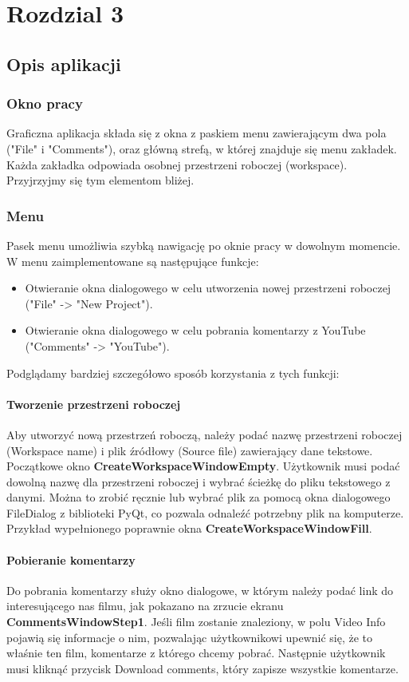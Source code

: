 \chapter{Rozdzial 3}

\section{Opis aplikacji}
	\subsection{Okno pracy}
		Graficzna aplikacja składa się z okna z paskiem menu zawierającym dwa pola ("File" i "Comments"), oraz główną strefą, w której znajduje się menu zakładek. Każda zakładka odpowiada osobnej przestrzeni roboczej (workspace). Przyjrzyjmy się tym elementom bliżej.

		
	\subsection{Menu}
		Pasek menu umożliwia szybką nawigację po oknie pracy w dowolnym momencie. W menu zaimplementowane są następujące funkcje:
		\begin{itemize}
			\item Otwieranie okna dialogowego w celu utworzenia nowej przestrzeni roboczej ("File" -> "New Project").
			\item Otwieranie okna dialogowego w celu pobrania komentarzy z YouTube ("Comments" -> "YouTube").
		\end{itemize}

		Podglądamy bardziej szczegółowo sposób korzystania z tych funkcji:

		
		\subsubsection{Tworzenie przestrzeni roboczej}
			Aby utworzyć nową przestrzeń roboczą, należy podać nazwę przestrzeni roboczej (Workspace name) i plik źródłowy (Source file) zawierający dane tekstowe. Początkowe okno \textbf{CreateWorkspaceWindowEmpty}. Użytkownik musi podać dowolną nazwę dla przestrzeni roboczej i wybrać ścieżkę do pliku tekstowego z danymi. Można to zrobić ręcznie lub wybrać plik za pomocą okna dialogowego FileDialog z biblioteki PyQt, co pozwala odnaleźć potrzebny plik na komputerze. Przykład wypełnionego poprawnie okna \textbf{CreateWorkspaceWindowFill}.

		
		\subsubsection{Pobieranie komentarzy}
			Do pobrania komentarzy służy okno dialogowe, w którym należy podać link do interesującego nas filmu, jak pokazano na zrzucie ekranu \textbf{CommentsWindowStep1}. Jeśli film zostanie znaleziony, w polu Video Info pojawią się informacje o nim, pozwalając użytkownikowi upewnić się, że to właśnie ten film, komentarze z którego chcemy pobrać. Następnie użytkownik musi kliknąć przycisk Download comments, który zapisze wszystkie komentarze.
		
